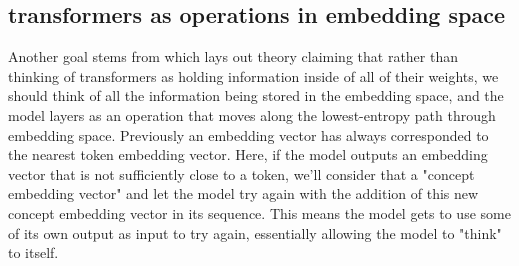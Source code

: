 \documentclass{article}
\begin{document}
\subsection{transformers as operations in embedding space}
Another goal stems from \cite{singh2023analyzing} which lays out theory claiming that rather than thinking of transformers as holding information inside of all of their weights, we should think of all the information being stored in the embedding space, and the model layers as an operation that moves along the lowest-entropy path through embedding space.
Previously an embedding vector has always corresponded to the nearest token embedding vector. 
Here, if the model outputs an embedding vector that is not sufficiently close to a token, we'll consider that a "concept embedding vector" and let the model try again with the addition of this new concept embedding vector in its sequence.
This means the model gets to use some of its own output as input to try again, essentially allowing the model to "think" to itself.\par
\end{document}
